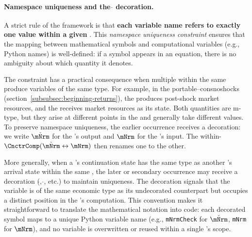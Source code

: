 \documentclass[SolvingMicroDSOPs]{subfiles}
\begin{document}
\hypertarget{namespace-uniqueness}{}
\paragraph{Namespace uniqueness and the $\check{}$ decoration.}
A strict rule of the framework is that \textbf{each variable name refers
to exactly one value within a given {\interval}}. This
\textit{namespace uniqueness constraint} ensures that the mapping between
mathematical symbols and computational variables (e.g., Python names) is
well-defined: if a symbol appears in an equation, there is no ambiguity
about which quantity it denotes.

The constraint has a practical consequence when multiple {\stgs} within
the same {\interval} produce variables of the same type. For example,
in the portable--consnoshocks {\interval}
(section~\ref{subsubsec:beginning-returns}), the 
{\stg} produces post-shock market resources, and the
 {\stg} receives market resources as its
{\Arrival} state. Both quantities are m-type, but they arise at
different points in the {\interval} and generally take different values.
To preserve namespace uniqueness, the earlier occurrence receives a
decoration: we write $\check{\mNrm}$ for the  {\stg}'s
output and $\mNrm$ for the  {\stg}'s input.
The within-{\interval} {\Cnct}
$\CnctrComp(\check{\mNrm} \leftrightarrow \mNrm)$ then renames one to
the other.

More generally, when a {\stg}'s continuation state has the same type as
another {\stg}'s arrival state within the same {\interval}, the later or
secondary occurrence may receive a decoration ($\check{}$, $\hat{}$,
etc.) to maintain uniqueness. The decoration signals that the variable
is of the same economic type as its undecorated counterpart but occupies
a distinct position in the {\interval}'s computation. This convention
makes it straightforward to translate the mathematical notation into code:
each decorated symbol maps to a unique Python variable name (e.g.,
\texttt{mNrmCheck} for $\check{\mNrm}$, \texttt{mNrm} for $\mNrm$),
and no variable is overwritten or reused within a single {\interval}'s
scope.
\end{document}
